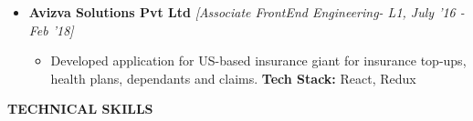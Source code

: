 \documentclass[a4paper,11pt]{article}
\newcommand{\lsep}{-0.5cm}
\newcommand{\resheading}[1]{{\small \colorbox{mygrey}{\begin{minipage}{0.975\textwidth}{\textbf{#1 \vphantom{p\^{E}}}}\end{minipage}}}}
\begin{document}
\begin{itemize}
\begin{itemize}
\end{itemize}
\item \textbf{Avizva Solutions Pvt Ltd} \emph{[Associate FrontEnd Engineering- L1, July '16 - Feb '18]}\\[-0.6cm]
\begin{itemize}
\item Developed application for US-based insurance giant for insurance top-ups, health plans, dependants and claims.
\textbf{Tech Stack:} React, Redux
\end{itemize}



\end{itemize}


\resheading{\textbf{\large TECHNICAL SKILLS}}\\[\lsep]
\end{document}
